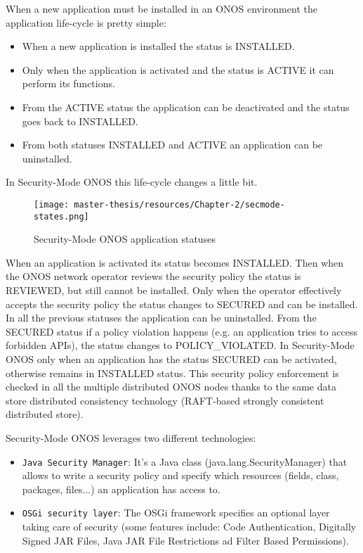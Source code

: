 \documentclass[a4paper,10pt]{memoir}
\begin{document}
When a new application must be installed in an ONOS environment the application life-cycle is pretty simple: 
\begin{itemize}
    \item When a new application is installed the status is INSTALLED.
    \item Only when the application is activated and the status is ACTIVE it can perform its functions.
    \item From the ACTIVE status the application can be deactivated and the status goes back to INSTALLED.
    \item From both statuses INSTALLED and ACTIVE an application can be uninstalled. 
\end{itemize}
In Security-Mode ONOS this life-cycle changes a little bit.
\begin{figure}[h]
\caption{Security-Mode ONOS application statuses}
\label{fig:secmode-states}
\texttt{[image: master-thesis/resources/Chapter-2/secmode-states.png]}
\centering
\end{figure}
When an application is activated its status becomes INSTALLED. Then when the ONOS network operator reviews the security policy the status is REVIEWED, but still cannot be installed. Only when the operator effectively accepts the security policy the status changes to SECURED and can be installed. In all the previous statuses the application can be uninstalled. From the SECURED status if a policy violation happens (e.g. an application tries to access forbidden APIs), the status changes to POLICY\_VIOLATED. In Security-Mode ONOS only when an application has the status SECURED can be activated, otherwise remains in INSTALLED status. This security policy enforcement is checked in all the multiple distributed ONOS nodes thanks to the same data store distributed consistency technology (RAFT-based strongly consistent distributed store).

Security-Mode ONOS leverages two different technologies:
\begin{itemize}
    \item\texttt{Java Security Manager}: It's a Java class (java.lang.SecurityManager) that allows to write a security policy and specify which resources (fields, class, packages, files...) an application has access to. 
    \item\texttt{OSGi security layer}: The OSGi framework specifies an optional layer taking care of security (some features include: Code Authentication, Digitally Signed JAR Files, Java JAR File Restrictions ad Filter Based Permissions).
\end{itemize}
\end{document}
